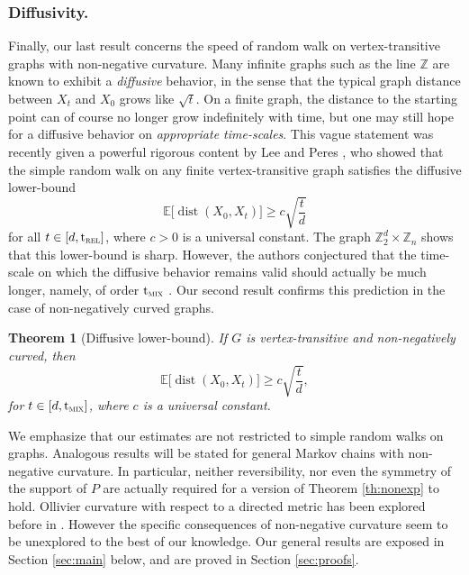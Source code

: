 \documentclass[10pt]{amsart}
\newtheorem{theorem}{Theorem}
\theoremstyle{definition}
\newcommand{\dZ}{\mathbb {Z}}
\newcommand{\EE}{{\mathbb{E}}}
\newcommand{\trel}{\mathrm{t}_{\textup{\textsc{rel}}}}
\newcommand{\tmix}{\mathrm{t}_{\textup{\textsc{mix}}}}
\DeclareMathOperator{\dist}{dist}
\begin{document}
\subsubsection*{Diffusivity.}Finally, our last result concerns the speed of random walk on vertex-transitive graphs with non-negative curvature. Many infinite graphs such as the line $\dZ$ are known to exhibit a \emph{diffusive} behavior, in the sense that the typical graph distance between $X_t$ and $X_0$ grows like $\sqrt{t}$. On a finite graph, the distance to the starting point can of course no longer grow indefinitely with time, but one may still hope for a diffusive behavior on \emph{appropriate time-scales}. This vague statement was recently given a powerful rigorous content by Lee and Peres \cite{MR3127886}, who showed that the simple random walk on any finite vertex-transitive graph satisfies the diffusive lower-bound
\begin{equation*}
\EE \bigl[\dist(X_0,X_t) \bigr] \ge c\sqrt{\frac{t}{d}}
\end{equation*} for all $t\in[d,\trel]$, where $c>0$ is a universal constant. The graph $\dZ_2^{d}\times \dZ_n$ shows that this lower-bound is sharp. However, the authors conjectured that the time-scale on which the diffusive behavior remains valid should actually be much longer, namely, of order $\tmix$ \cite[Conj.\,2.5]{MR3127886}.
Our second result confirms this prediction in the case of non-negatively curved graphs.
\begin{theorem}[Diffusive lower-bound]\label{th:speed}If $G$ is vertex-transitive and non-negatively curved, then
\begin{equation*}
\EE \bigl[\dist(X_0,X_t) \bigr] \ge c\sqrt{\frac{t}{d}},
\end{equation*}
for $t\in[d,\tmix]$, where $c$ is a universal constant.
\end{theorem}

We emphasize that our estimates are not restricted to simple random walks on graphs. Analogous results will be stated for general Markov chains with non-negative curvature. In particular, neither reversibility, nor even the symmetry of the support of $P$ are actually required for a version of Theorem \ref{th:nonexp} to hold.
Ollivier curvature with respect to a directed metric has been explored before in \cite{yamada2016ricci,ozawa2020geometric,ozawa2022heat,
eidi2020ollivierJournal}. However the specific consequences of non-negative curvature seem to be unexplored
to the best of our knowledge. Our general results are exposed in Section \ref{sec:main} below, and are proved in Section \ref{sec:proofs}.
\end{document}
